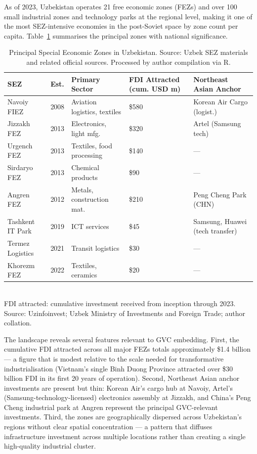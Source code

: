 As of 2023, Uzbekistan operates 21 free economic zones (FEZs) and over 100 small industrial zones and technology parks at the regional level, making it one of the most SEZ-intensive economies in the post-Soviet space by zone count per capita. Table~\ref{tab:sez_overview} summarises the principal zones with national significance.

\begin{table}[H]
 \centering
 \caption{Principal Special Economic Zones in Uzbekistan. Source: Uzbek SEZ materials and related official sources. Processed by author compilation via R.}
 \label{tab:sez_overview}
 \small
 \begin{tabular}{@{}p{2.8cm}p{1.3cm}p{2.5cm}p{1.5cm}p{2.8cm}@{}}
 \toprule
 SEZ & Est. & Primary Sector & FDI Attracted (cum. USD m) & Northeast Asian Anchor \\
 \midrule
 Navoiy FIEZ & 2008 & Aviation logistics, textiles & \$580 & Korean Air Cargo (logist.) \\
 Jizzakh FEZ & 2013 & Electronics, light mfg. & \$320 & Artel (Samsung tech) \\
 Urgench FEZ & 2013 & Textiles, food processing & \$140 & --- \\
 Sirdaryo FEZ & 2013 & Chemical products & \$90 & --- \\
 Angren FEZ & 2012 & Metals, construction mat. & \$210 & Peng Cheng Park (CHN) \\
 Tashkent IT Park & 2019 & ICT services & \$45 & Samsung, Huawei (tech transfer) \\
 Termez Logistics & 2021 & Transit logistics & \$30 & --- \\
 Khorezm FEZ & 2022 & Textiles, ceramics & \$20 & --- \\
 \bottomrule
 \end{tabular}
 \\\smallskip
 \small FDI attracted: cumulative investment received from inception through 2023. Source: Uzinfoinvest; Uzbek Ministry of Investments and Foreign Trade; author collation.
\end{table}

The landscape reveals several features relevant to GVC embedding. First, the cumulative FDI attracted across all major FEZs totals approximately \$1.4 billion --- a figure that is modest relative to the scale needed for transformative industrialisation (Vietnam's single Binh Duong Province attracted over \$30 billion FDI in its first 20 years of operation). Second, Northeast Asian anchor investments are present but thin: Korean Air's cargo hub at Navoiy, Artel's (Samsung-technology-licensed) electronics assembly at Jizzakh, and China's Peng Cheng industrial park at Angren represent the principal GVC-relevant investments. Third, the zones are geographically dispersed across Uzbekistan's regions without clear spatial concentration --- a pattern that diffuses infrastructure investment across multiple locations rather than creating a single high-quality industrial cluster.

